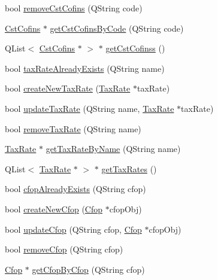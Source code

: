 \begin{DoxyCompactItemize}
\item 
bool \hyperlink{class_database_controller_a9926d742e99cb82a0b45b70e120c3116}{remove\-Cst\-Cofins} (\-Q\-String code)
\item 
\hyperlink{class_cst_cofins}{\-Cst\-Cofins} $\ast$ \hyperlink{class_database_controller_a83fa5494eac66bd00e1eb3899103e2a5}{get\-Cst\-Cofins\-By\-Code} (\-Q\-String code)
\item 
\-Q\-List$<$ \hyperlink{class_cst_cofins}{\-Cst\-Cofins} $\ast$ $>$ $\ast$ \hyperlink{class_database_controller_aa63f4379ede870c58dbbe64066ada4e2}{get\-Cst\-Cofinss} ()
\item 
bool \hyperlink{class_database_controller_af0baf47f127cc9f3d8f3a8276e915684}{tax\-Rate\-Already\-Exists} (\-Q\-String name)
\item 
bool \hyperlink{class_database_controller_aa86120d9f2362e0d402b90d04eb09c3c}{create\-New\-Tax\-Rate} (\hyperlink{class_tax_rate}{\-Tax\-Rate} $\ast$tax\-Rate)
\item 
bool \hyperlink{class_database_controller_a3a2e150b585b20e66949a7d2921aef96}{update\-Tax\-Rate} (\-Q\-String name, \hyperlink{class_tax_rate}{\-Tax\-Rate} $\ast$tax\-Rate)
\item 
bool \hyperlink{class_database_controller_a4f5935fdd1501cf15f5e4c6a52c0d922}{remove\-Tax\-Rate} (\-Q\-String name)
\item 
\hyperlink{class_tax_rate}{\-Tax\-Rate} $\ast$ \hyperlink{class_database_controller_ae177eee22180277701b0615d134d98a1}{get\-Tax\-Rate\-By\-Name} (\-Q\-String name)
\item 
\-Q\-List$<$ \hyperlink{class_tax_rate}{\-Tax\-Rate} $\ast$ $>$ $\ast$ \hyperlink{class_database_controller_ad33d2490b8cedf288552dda19aa6bbcc}{get\-Tax\-Rates} ()
\item 
bool \hyperlink{class_database_controller_a526c1329c00039eb2ce56ff3290baa74}{cfop\-Already\-Exists} (\-Q\-String cfop)
\item 
bool \hyperlink{class_database_controller_a5ec7415cc7cdc1e6d617d1d455ce408b}{create\-New\-Cfop} (\hyperlink{class_cfop}{\-Cfop} $\ast$cfop\-Obj)
\item 
bool \hyperlink{class_database_controller_a57e9e36d56eaa86f7efbb4956ec0c244}{update\-Cfop} (\-Q\-String cfop, \hyperlink{class_cfop}{\-Cfop} $\ast$cfop\-Obj)
\item 
bool \hyperlink{class_database_controller_a4ad9ec00c42e3ef48d6512fb575524d3}{remove\-Cfop} (\-Q\-String cfop)
\item 
\hyperlink{class_cfop}{\-Cfop} $\ast$ \hyperlink{class_database_controller_a17d113832dafecc3a602e35da5abc78e}{get\-Cfop\-By\-Cfop} (\-Q\-String cfop)

\end{DoxyCompactItemize}
